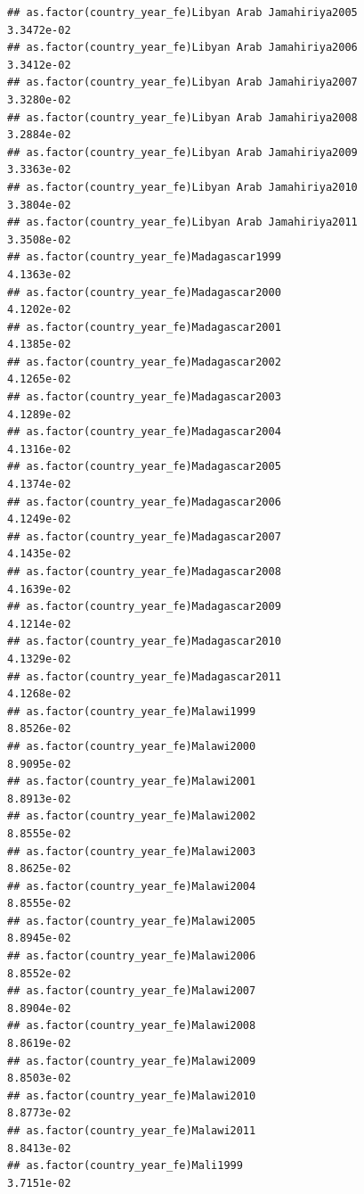 \documentclass[
  a4paper,
]{article}
\begin{document}
\begin{verbatim}
## as.factor(country_year_fe)Libyan Arab Jamahiriya2005            3.3472e-02
## as.factor(country_year_fe)Libyan Arab Jamahiriya2006            3.3412e-02
## as.factor(country_year_fe)Libyan Arab Jamahiriya2007            3.3280e-02
## as.factor(country_year_fe)Libyan Arab Jamahiriya2008            3.2884e-02
## as.factor(country_year_fe)Libyan Arab Jamahiriya2009            3.3363e-02
## as.factor(country_year_fe)Libyan Arab Jamahiriya2010            3.3804e-02
## as.factor(country_year_fe)Libyan Arab Jamahiriya2011            3.3508e-02
## as.factor(country_year_fe)Madagascar1999                        4.1363e-02
## as.factor(country_year_fe)Madagascar2000                        4.1202e-02
## as.factor(country_year_fe)Madagascar2001                        4.1385e-02
## as.factor(country_year_fe)Madagascar2002                        4.1265e-02
## as.factor(country_year_fe)Madagascar2003                        4.1289e-02
## as.factor(country_year_fe)Madagascar2004                        4.1316e-02
## as.factor(country_year_fe)Madagascar2005                        4.1374e-02
## as.factor(country_year_fe)Madagascar2006                        4.1249e-02
## as.factor(country_year_fe)Madagascar2007                        4.1435e-02
## as.factor(country_year_fe)Madagascar2008                        4.1639e-02
## as.factor(country_year_fe)Madagascar2009                        4.1214e-02
## as.factor(country_year_fe)Madagascar2010                        4.1329e-02
## as.factor(country_year_fe)Madagascar2011                        4.1268e-02
## as.factor(country_year_fe)Malawi1999                            8.8526e-02
## as.factor(country_year_fe)Malawi2000                            8.9095e-02
## as.factor(country_year_fe)Malawi2001                            8.8913e-02
## as.factor(country_year_fe)Malawi2002                            8.8555e-02
## as.factor(country_year_fe)Malawi2003                            8.8625e-02
## as.factor(country_year_fe)Malawi2004                            8.8555e-02
## as.factor(country_year_fe)Malawi2005                            8.8945e-02
## as.factor(country_year_fe)Malawi2006                            8.8552e-02
## as.factor(country_year_fe)Malawi2007                            8.8904e-02
## as.factor(country_year_fe)Malawi2008                            8.8619e-02
## as.factor(country_year_fe)Malawi2009                            8.8503e-02
## as.factor(country_year_fe)Malawi2010                            8.8773e-02
## as.factor(country_year_fe)Malawi2011                            8.8413e-02
## as.factor(country_year_fe)Mali1999                              3.7151e-02

\end{verbatim}
\end{document}
